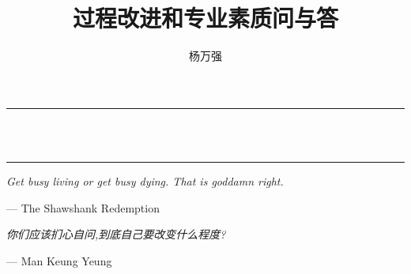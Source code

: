 \documentclass[11pt]{article}
\title{过程改进和专业素质问与答}
\author{杨万强}
\begin{document}
\begin{titlepage}

\begin{minipage}{\textwidth}
\vspace{130pt}
\hspace{33pt}{\large \itshape 杨万强的}
\end{minipage}

\begin{center}
\begin{minipage}{.8\textwidth}
\centering
\rule{\linewidth}{0.5mm}\\[.4cm]
\\[.2cm]
\rule{\linewidth}{0.5mm}
\end{minipage}
\end{center}

\begin{minipage}{\textwidth}
\centering
\vspace{50pt}
\end{minipage}
\vfill
\end{titlepage}


\thispagestyle{empty}
\begin{minipage}{\textwidth}
\vspace{200pt}

{\centering \itshape \Large {%
Get busy living or get busy dying. That is goddamn right.} }
\begin{flushright}
---  {%
The Shawshank Redemption
}
\end{flushright}
\end{minipage}

\begin{minipage}{\textwidth}
\vspace{50pt}
{\centering \Large \textit{你们应该扪心自问,到底自己要改变什么程度?}}
\begin{flushright}
---  {%
Man Keung Yeung}
\end{flushright}
\end{minipage}

\pagebreak
\setcounter{page}{1}
\pagestyle{plain}
{\footnotesize\textsf{\tableofcontents}}
\end{document}

